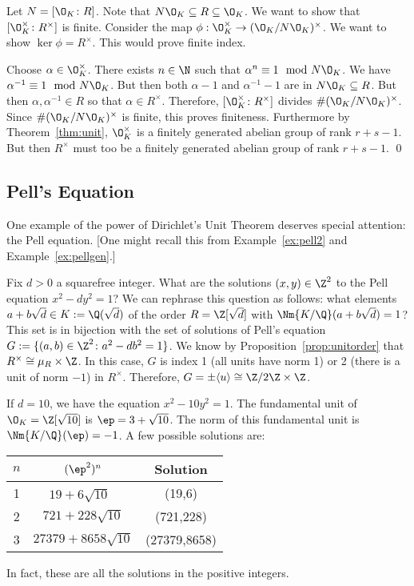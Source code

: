 \pf Let $N=[\O_K \colon R]$. Note that $N \O_K \subseteq R \subseteq \O_K$. We want to show that $[\O_K^\times \colon R^\times]$ is finite. Consider the map $\phi: \O_K^\times \to (\O_K/N\O_K)^\times$. We want to show $\ker \phi= R^\times$. This would prove finite index. 

Choose $\alpha \in \O_K^\times$. There exists $n \in \N$ such that $\alpha^n \equiv 1 \mod N\O_K$. We have $\alpha^{-1} \equiv 1 \mod N\O_K$. But then both $\alpha-1$ and $\alpha^{-1}-1$ are in $N\O_K \subseteq R$. But then $\alpha,\alpha^{-1} \in R$ so that $\alpha \in R^\times$. Therefore, $[\O_K^\times \colon R^\times]$ divides $\#(\O_K/N\O_K)^\times$. Since $\#(\O_K/N\O_K)^\times$ is finite, this proves finiteness. Furthermore by Theorem~\ref{thm:unit}, $\O_K^\times$ is a finitely generated abelian group of rank $r+s-1$. But then $R^\times$ must too be a finitely generated abelian group of rank $r+s-1$. \qed \\





\subsection{Pell's Equation \label{sec:pell}}





One example of the power of Dirichlet's Unit Theorem deserves special attention: the Pell equation. [One might recall this from Example~\ref{ex:pell2} and Example~\ref{ex:pellgen}.]

Fix $d>0$ a squarefree integer. What are the solutions $(x,y) \in \Z^2$ to the Pell equation $x^2-dy^2=1$? We can rephrase this question as follows: what elements $a+b\sqrt{d} \in K:=\Q(\sqrt{d})$ of the order $R=\Z[\sqrt{d}]$ with $\Nm{K/\Q}(a+b\sqrt{d})=1$? This set is in bijection with the set of solutions of Pell's equation $G:=\{(a,b) \in \Z^2 \colon a^2-db^2=1\}$. We know by Proposition~\ref{prop:unitorder} that $R^\times \cong \mu_R \times \Z$. In this case, $G$ is index 1 (all units have norm 1) or 2 (there is a unit of norm $-1$) in $R^\times$. Therefore, $G= \pm \langle u \rangle \cong \Z/2\Z \times \Z$. 

\begin{ex}
If $d=10$, we have the equation $x^2-10y^2=1$. The fundamental unit of $\O_K=\Z[\sqrt{10}]$ is $\ep=3+\sqrt{10}$. The norm of this fundamental unit is $\Nm{K/\Q}(\ep)= -1$. A few possible solutions are:
	\begin{table}[H]
	\centering
	\begin{tabular}{ccc}
	$n$ & $(\ep^2)^n$ & Solution \\ \hline
	1 & $19+6\sqrt{10}^{\phantom{\int}}$ & (19,6) \\
	2 & $721+228\sqrt{10}$ & (721,228) \\
	3 & $27379+8658\sqrt{10}$ & (27379,8658)
	\end{tabular}
	\end{table}
In fact, these are all the solutions in the positive integers. \xqed
\end{ex}

